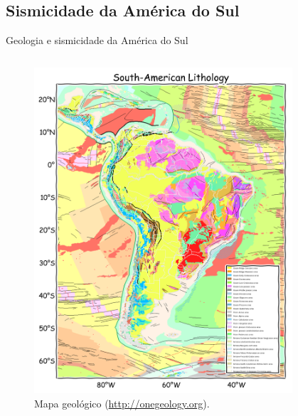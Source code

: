 \documentclass[ucs,8pt]{beamer}
\begin{document}
\subsection{Sismicidade da América do Sul}
\begin{frame}{Geologia e sismicidade da América do Sul}

\begin{columns}[T]
	\begin{column}[T]{0.5\textwidth}
		\begin{figure}[T]
		  \centering
		  \includegraphics[width=.85\textwidth]{lithology_sa} 
		  \caption{Mapa geológico (\url{http://onegeology.org}).}
		  \label{fig:sa_tec} 
		\end{figure}
	\end{column}
	\begin{column}[T]{0.49\textwidth}
		\begin{figure}[T]
		  \centering

\end{figure}
\end{column}
\end{columns}
\end{frame}
\end{document}
